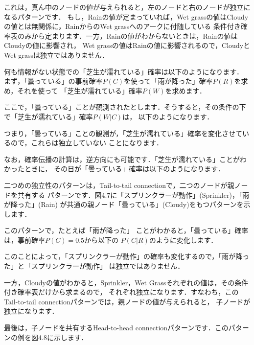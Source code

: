 これは，真ん中のノードの値が与えられると，左のノードと右のノードが独立になるパターンです．
もし，Rainの値が定まっていれば，Wet grassの値はCloudyの値とは無関係に，RainからのWet grassへのアークに付随している
条件付き確率表のみから定まります．一方，Rainの値がわからないときは，Rainの値はCloudyの値に影響され，
Wet grassの値はRainの値に影響されるので，CloudyとWet grassは独立ではありません．

何も情報がない状態での「芝生が濡れている」確率は以下のようになります．
まず，「曇っている」の事前確率$P(C)$を使って「雨が降った」確率$P(R)$を求め，それを使って
「芝生が濡れている」確率$P(W)$を求めます．


ここで，「曇っている」ことが観測されたとします．そうすると，その条件の下で「芝生が濡れている」確率$P(W|C)$は，
以下のようになります．


つまり，「曇っている」ことの観測が，「芝生が濡れている」確率を変化させているので，これらは独立していない
ことになります．

なお，確率伝播の計算は，逆方向にも可能です．「芝生が濡れている」ことがわかったときに，
その日が「曇っている」確率は以下のようになります．



二つめの独立性のパターンは，Tail-to-tail connectionで，二つのノードが親ノードを共有する
パターンです．図4.7に「スプリンクラーが動作」(Sprinkler)，「雨が降った」(Rain)
が共通の親ノード「曇っている」(Cloudy)をもつパターンを示します．


このパターンで，たとえば「雨が降った」 ことがわかると，「曇っている」確率は，事前確率$P(C)=0.5$から以下の
$P(C|R)$のように変化します．


このことによって，「スプリンクラーが動作」の確率も変化するので，「雨が降った」と「スプリンクラーが動作」
は独立ではありません．

一方，Cloudyの値がわかると，Sprinkler，Wet Grassそれぞれの値は，その条件付き確率表だけから求まるので，
それぞれ独立になります．すなわち，このTail-to-tail connectionパターンでは，親ノードの値が与えられると，
子ノードが独立になります．


最後は，子ノードを共有するHead-to-head connectionパターンです．このパターンの例を図4.8に示します．


